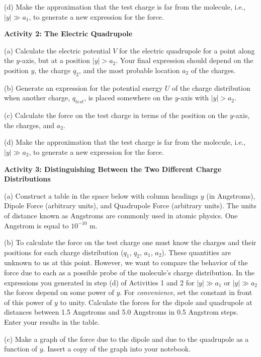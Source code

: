 (d) Make the approximation that the test charge is far from the molecule,
i.e., $\left| y\right|  \gg  a_1$, to generate
a new expression for the force.
\answerspace{20mm}

\textbf{Activity 2: The Electric Quadrupole} 

(a) Calculate the electric potential $V$ for the electric quadrupole
for a point along the $y$-axis, but at a position $\left| y\right|  > a_2$. Your final expression should depend on the position $y$, the charge $q_2$, and the most probable location $a_2$ of the
charges.
\answerspace{20mm}

(b) Generate an expression for the potential energy $U$ of the charge
distribution when another charge, $q_{test}$, is placed somewhere
on the $y$-axis with $\left| y\right|   > a_2$.
\answerspace{20mm}

(c) Calculate the force on the test charge in terms of the position
on the $y$-axis, the charges, and $a_2$.
\answerspace{25mm}

\pagebreak[2]
(d) Make the approximation that the test charge is far from the molecule,
i.e., $\left| y\right|  \gg a_2$, to generate
a new expression for the force.
\answerspace{25mm}

\textbf{Activity 3: Distinguishing Between the Two Different Charge
Distributions} 

(a) Construct a table in the space below with column headings $y$ (in Angstroms),
Dipole Force (arbitrary units), and Quadrupole Force (arbitrary units).
The units of distance known as Angstroms are commonly used in atomic
physics. One Angstrom is equal to $10^{-10}$ m.
\answerspace{25mm}

(b) To calculate the force on the test charge one must know the charges
and their positions for each charge distribution ($q_1$, $q_2$, $a_1$, $a_2$). 
These quantities are unknown to us at
this point. However, we want to compare the behavior of the force
due to each as a possible probe of the molecule's charge distribution.
In the expressions you generated in step (d) of Activities 1 and 2
for $\left| y\right| \gg a_1$ or $\left| y\right| \gg  a_2$ the forces depend on some power of $y$. For
\emph{convenience}, set the constant in front of this power of $y$ to
unity. Calculate the forces for the dipole and quadrupole at distances
between 1.5 Angstroms and 5.0 Angstroms in 0.5 Angstrom steps. Enter
your results in the table.

(c) Make a graph of the force due to the dipole and due to the quadrupole
as a function of $y$. Insert a copy of the graph into your notebook.

